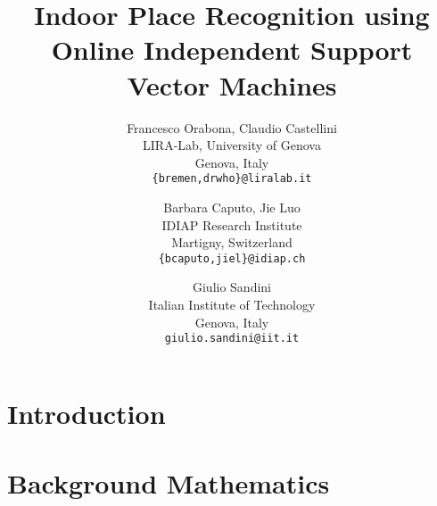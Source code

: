 \documentclass{bmvc}
\begin{document}

\title{Indoor Place Recognition using Online Independent Support Vector Machines}

\author{
Francesco Orabona, Claudio Castellini\\
LIRA-Lab, University of Genova\\
Genova, Italy\\
{\tt\small \{bremen,drwho\}@liralab.it}
\and
Barbara Caputo, Jie Luo\\
IDIAP Research Institute\\
Martigny, Switzerland\\
{\tt\small \{bcaputo,jiel\}@idiap.ch}
\and
Giulio Sandini\\
Italian Institute of Technology\\
Genova, Italy\\
{\tt\small giulio.sandini@iit.it}
}


\maketitle


\begin{abstract}
  
\end{abstract}

\section{Introduction}
\label{introduction}


%

\section{Background Mathematics}
\label{sec:bg}

\end{document}
